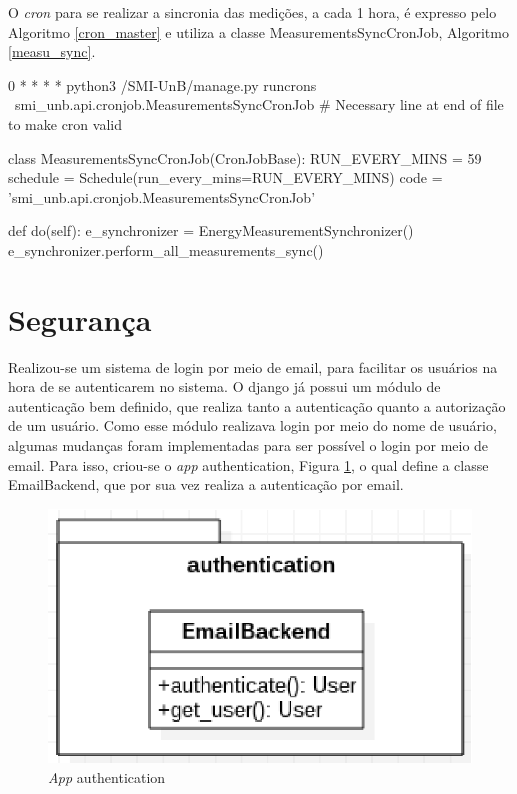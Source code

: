 O \textit{cron} para se realizar a sincronia das medições, a cada 1 hora, é expresso pelo Algoritmo \ref{cron_master} e utiliza a classe MeasurementsSyncCronJob, Algoritmo \ref{measu_sync}.

\begin{python}[caption={\textit{Cron} para execução da sincronia dos dados de energia.}, captionpos=b, label={cron_master}]
0 * * * * python3 /SMI-UnB/manage.py runcrons \
smi_unb.api.cronjob.MeasurementsSyncCronJob
# Necessary line at end of file to make cron valid
\end{python}

\begin{python}[caption={Classe MeasurementsSyncCronJob.}, captionpos=b, label={measu_sync}]
class MeasurementsSyncCronJob(CronJobBase):
    RUN_EVERY_MINS = 59
    schedule = Schedule(run_every_mins=RUN_EVERY_MINS)
    code = 'smi_unb.api.cronjob.MeasurementsSyncCronJob'

    def do(self):
        e_synchronizer = EnergyMeasurementSynchronizer()
        e_synchronizer.perform_all_measurements_sync()
\end{python}

\section{Segurança}
Realizou-se um sistema de login por meio de email, para facilitar os usuários na hora de se autenticarem no sistema. O django já possui um módulo de autenticação bem definido, que realiza tanto a autenticação quanto a autorização de um usuário. Como esse módulo realizava login por meio do nome de usuário, algumas mudanças foram implementadas para ser possível o login por meio de email. Para isso, criou-se o \textit{app} authentication, Figura \ref{authentication}, o qual define a classe EmailBackend, que por sua vez realiza a autenticação por email.

\begin{figure}[!h]
    \centering
    \includegraphics[keepaspectratio=true,scale=0.8]{figuras/authentication.eps}
    \caption{\textit{App} authentication}
    \label{authentication}
\end{figure}


